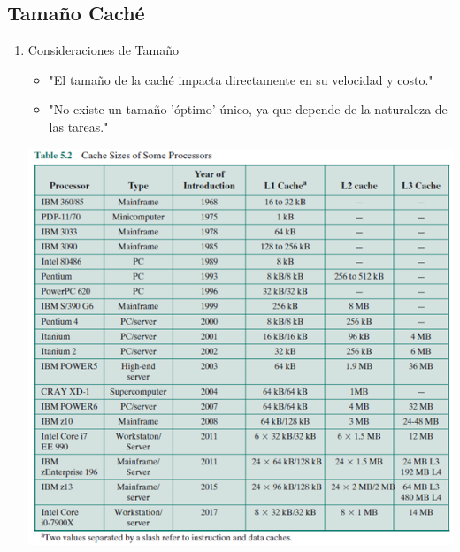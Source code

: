 \documentclass[presentation]{beamer}
\begin{document}
\subsection{Tamaño Caché}
\label{sec:org8bd8887}
\begin{enumerate}
\item Consideraciones de Tamaño
\label{sec:orgbc85849}
\begin{itemize}
\item "El tamaño de la caché impacta directamente en su velocidad y costo."
\item "No existe un tamaño 'óptimo' único, ya que depende de la naturaleza de las tareas."
\end{itemize}

\begin{center}
\includegraphics[width=.9\linewidth]{./Imagenes/tabla5.2.png}
\end{center}
\end{enumerate}
\end{document}

